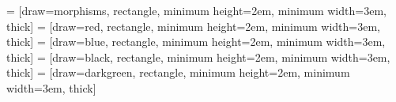 
\usepackage{tikz}


\usetikzlibrary{positioning,
  intersections,
  hobby,
  patterns,
  calc,
  decorations.pathmorphing,
  decorations.markings,
  shadows,
  shapes,
  cd,
  decorations.markings,
  positioning,
  arrows.meta,
  shapes,
  calc,
  fit,
  quotes,
backgrounds}

\usepackage{tikzpagenodes}



 = [draw=morphisms, rectangle, minimum height=2em, minimum width=3em, thick]
 = [draw=red, rectangle, minimum height=2em, minimum width=3em, thick]
 = [draw=blue, rectangle, minimum height=2em, minimum width=3em, thick]
 = [draw=black, rectangle, minimum height=2em, minimum width=3em, thick]
 = [draw=darkgreen, rectangle, minimum height=2em, minimum width=3em, thick]



\def\preceqSize{10pt}
\newcommand{\hasselinewidth}{2mm}


